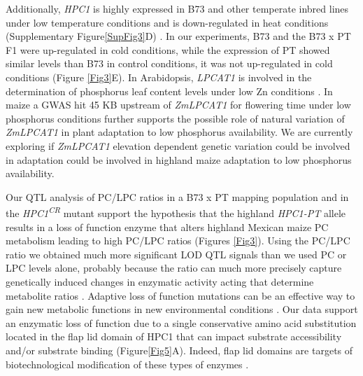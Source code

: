 \documentclass[9pt,twocolumn,twoside,lineno]{BioRxiv}
\begin{document}
Additionally, \textit{HPC1} is highly expressed in B73 and other temperate inbred lines under low temperature conditions and is down-regulated in heat conditions (Supplementary Figure\ref{SupFig3}D) \cite{Waters2017-nat}.
In our experiments, B73 and the B73 x PT F1 were up-regulated in cold conditions, while the expression of PT showed similar levels than B73 in control conditions, it was not up-regulated in cold conditions (Figure \ref{Fig3}E).
In Arabidopsis, \textit{LPCAT1} is involved in the determination of phosphorus leaf content levels under low Zn conditions \cite{Kisko2018-zm}.
In maize a GWAS hit 45 KB upstream of \textit{ZmLPCAT1} for flowering time under low phosphorus conditions further supports the possible role of natural variation of \textit{ZmLPCAT1} in plant adaptation to low phosphorus availability. 
We are currently exploring if \textit{ZmLPCAT1} elevation dependent genetic variation could be involved in adaptation could be involved in highland maize adaptation to low phosphorus availability.

Our QTL analysis of PC/LPC ratios in a B73 x PT mapping population and in the \textit{HPC1\textsuperscript{CR}} mutant support the hypothesis that the highland \textit{HPC1-PT} allele results in a loss of function enzyme that alters highland Mexican maize PC metabolism leading to high PC/LPC ratios (Figures \ref{Fig3}). 
Using the PC/LPC ratio we obtained much more significant LOD QTL signals than we used PC or LPC levels alone, probably because the ratio can much more precisely capture genetically induced changes in enzymatic activity acting that determine metabolite ratios \cite{Petersen2012-ii}.
Adaptive loss of function mutations can be an effective way to gain new metabolic functions in new environmental conditions \cite{Hottes2013-np}. 
Our data support an enzymatic loss of function due to a single conservative amino acid substitution located in the flap lid domain of HPC1 that can impact substrate  accessibility and/or substrate binding (Figure\ref{Fig5}A). 
Indeed, flap lid domains are targets of biotechnological modification of these types of enzymes \cite{Khan2017-ua}.
\end{document}

